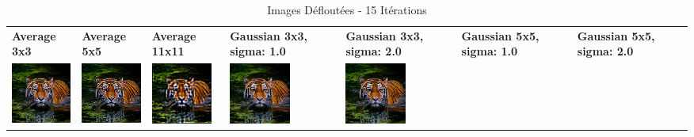 \begin{table}[h!]
    \centering
    \captionsetup{justification=centering}
    \caption*{Images Défloutées - 15 Itérations}
    \begin{tabular}{>{\centering\arraybackslash} m{2cm} >{\centering\arraybackslash} m{2cm} >{\centering\arraybackslash} m{2cm} >{\centering\arraybackslash} m{2cm} >{\centering\arraybackslash} m{2cm} >{\centering\arraybackslash} m{2cm} >{\centering\arraybackslash} m{2cm}}
        \textbf{Average 3x3}                                                                            & \textbf{Average 5x5} & \textbf{Average 11x11} & \textbf{Gaussian 3x3, sigma: 1.0} & \textbf{Gaussian 3x3, sigma: 2.0} & \textbf{Gaussian 5x5, sigma: 1.0} & \textbf{Gaussian 5x5, sigma: 2.0} \\
        \includegraphics[width=2cm]{images/processed/tiger/average_3x3/unblurred_15-iter.png}           &
        \includegraphics[width=2cm]{images/processed/tiger/average_5x5/unblurred_15-iter.png}           &
        \includegraphics[width=2cm]{images/processed/tiger/average_11x11/unblurred_15-iter.png}         &
        \includegraphics[width=2cm]{images/processed/tiger/gaussian_3x3_sigma1.0/unblurred_15-iter.png} &
        \includegraphics[width=2cm]{images/processed/tiger/gaussian_3x3_sigma2.0/unblurred_15-iter.png} &

\end{tabular}
\end{table}
